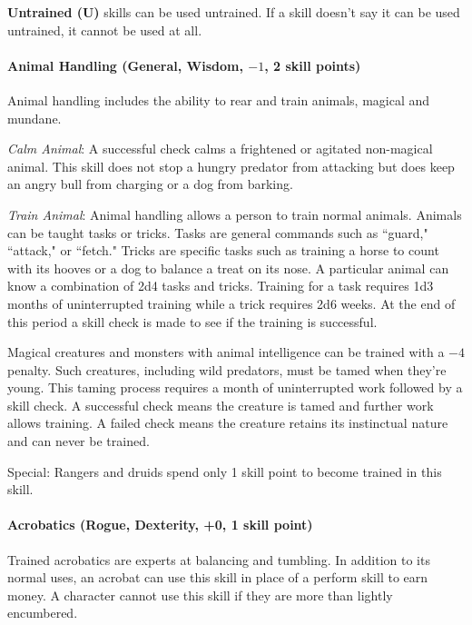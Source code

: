 \begin{multicols}{2}
\textbf{Untrained (U)} skills can be used untrained.  If a skill doesn't say it can be used untrained, it cannot be used at all.

\paragraph{Animal Handling (General, Wisdom, $-1$, 2 skill points)}

Animal handling includes the ability to rear and train animals, magical and mundane.  

\textit{Calm Animal}: A successful check calms a frightened or agitated non-magical animal.  This skill does not stop a hungry predator from attacking but does keep an angry bull from charging or a dog from barking.

\textit{Train Animal}: Animal handling allows a person to train normal animals.  Animals can be taught tasks or tricks.  Tasks are general commands such as ``guard," ``attack," or ``fetch."  Tricks are specific tasks such as training a horse to count with its hooves or a dog to balance a treat on its nose.  A particular animal can know a combination of 2d4 tasks and tricks.  Training for a task requires 1d3 months of uninterrupted training while a trick requires 2d6 weeks.  At the end of this period a skill check is made to see if the training is successful.

Magical creatures and monsters with animal intelligence can be trained with a $-4$ penalty.  Such creatures, including wild predators, must be tamed when they're young.  This taming process requires a month of uninterrupted work followed by a skill check.  A successful check means the creature is tamed and further work allows training.  A failed check means the creature retains its instinctual nature and can never be trained.

Special: Rangers and druids spend only 1 skill point to become trained in this skill.  

\paragraph{Acrobatics (Rogue, Dexterity, +0, 1 skill point)}

Trained acrobatics are experts at balancing and tumbling.  In addition to its normal uses, an acrobat can use this skill in place of a perform skill to earn money.  A character cannot use this skill if they are more than lightly encumbered. 


\end{multicols}
